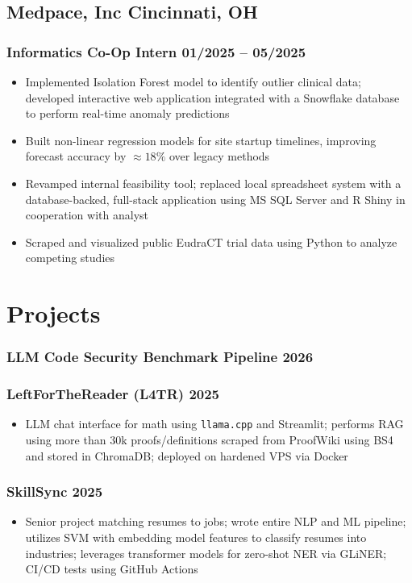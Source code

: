 \documentclass[10pt]{article} %
\begin{document}
\subsection{Medpace, Inc \hfill Cincinnati, OH}
\subsubsection{Informatics Co-Op Intern \hfill 01/2025 -- 05/2025}
\begin{itemize}
	\item Implemented Isolation Forest model to identify outlier clinical data; developed interactive web application integrated with a Snowflake database to perform real-time anomaly predictions
	\item Built non-linear regression models for site startup timelines, improving forecast accuracy by $\approx 18\%$ over legacy methods
	\item Revamped internal feasibility tool; replaced local spreadsheet system with a database-backed, full-stack application using MS SQL Server and R Shiny in cooperation with analyst
	\item Scraped and visualized public EudraCT trial data using Python to analyze competing studies
\end{itemize}

\section{Projects}
\subsubsection{LLM Code Security Benchmark Pipeline \hfill 2026}
\subsubsection{LeftForTheReader (L4TR) \hfill 2025}
\begin{itemize}
	\item LLM chat interface for math using \verb|llama.cpp| and Streamlit; performs RAG using more than 30k proofs/definitions scraped from ProofWiki using BS4 and stored in ChromaDB; deployed on hardened VPS via Docker
\end{itemize}
\vspace{-7pt}
\subsubsection{SkillSync \hfill 2025}
\begin{itemize}
	\item Senior project matching resumes to jobs; wrote entire NLP and ML pipeline; utilizes SVM with embedding model features to classify resumes into industries; leverages transformer models for zero-shot NER via GLiNER; CI/CD tests using GitHub Actions
\end{itemize}
\vspace{-7pt}
\end{document}
